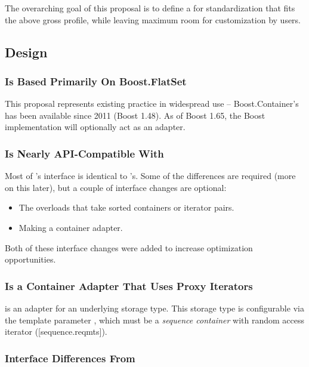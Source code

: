 The overarching goal of this proposal is to define a  for
standardization that fits the above gross profile, while leaving maximum room
for customization by users.

\subsection{Design}

\subsubsection{ Is Based Primarily On Boost.FlatSet}

This proposal represents existing practice in widespread use --
Boost.Container's  has been available since 2011 (Boost 1.48).
As of Boost 1.65, the Boost implementation will optionally act as an adapter.

\subsubsection{ Is Nearly API-Compatible With }

Most of 's interface is identical to 's.  Some of the
differences are required (more on this later), but a couple of interface
changes are optional:

\begin{itemize}
  \item The overloads that take sorted containers or iterator pairs.

  \item Making  a container adapter.
\end{itemize}

Both of these interface changes were added to increase optimization
opportunities.

\subsubsection{ Is a Container Adapter That Uses Proxy Iterators}

 is an adapter for an underlying storage type.  This storage
type is configurable via the template parameter , which must
be a \textit{sequence container} with random access iterator ([sequence.reqmts]).\\

\subsubsection{Interface Differences From }

